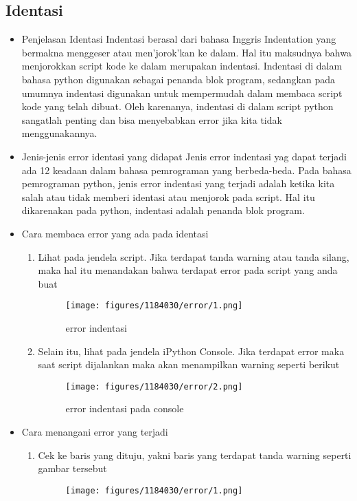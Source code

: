 \begin{enumerate}
\section{Identasi}
\begin{itemize}
	\item Penjelasan Identasi
		Indentasi berasal dari bahasa Inggris Indentation yang bermakna menggeser atau men'jorok'kan ke dalam. Hal itu maksudnya bahwa menjorokkan script kode ke dalam merupakan indentasi. Indentasi di dalam bahasa python digunakan sebagai penanda blok program, sedangkan pada umumnya indentasi digunakan untuk mempermudah dalam membaca script kode yang telah dibuat. Oleh karenanya, indentasi di dalam script python sangatlah penting dan bisa menyebabkan error jika kita tidak menggunakannya.
	\item Jenis-jenis error identasi yang didapat
			Jenis error indentasi yag dapat terjadi ada 12 keadaan dalam bahasa pemrograman yang berbeda-beda. Pada bahasa pemrograman python, jenis error indentasi yang terjadi adalah ketika kita salah atau tidak memberi identasi atau menjorok pada script. Hal itu dikarenakan pada python, indentasi adalah penanda blok program.
	\item Cara membaca error yang ada pada identasi
	\begin{enumerate}
	\item Lihat pada jendela script. Jika terdapat tanda warning atau tanda silang, maka hal itu menandakan bahwa terdapat error pada script yang anda buat
			\begin{figure}[H]
			\texttt{[image: figures/1184030/error/1.png]}
			\centering
			\caption{error indentasi}
			\end{figure}
	\item Selain itu, lihat pada jendela iPython Console. Jika terdapat error maka saat script dijalankan maka akan menampilkan warning seperti berikut
			\begin{figure}[H]
			\texttt{[image: figures/1184030/error/2.png]}
			\centering
			\caption{error indentasi pada console}
			\end{figure}
	\end{enumerate}
	\item Cara menangani error yang terjadi
	\begin{enumerate}
		\item Cek ke baris yang dituju, yakni baris yang terdapat tanda warning seperti gambar tersebut
			\begin{figure}[H]
			\texttt{[image: figures/1184030/error/1.png]}

\end{figure}
\end{enumerate}
\end{itemize}
\end{enumerate}
